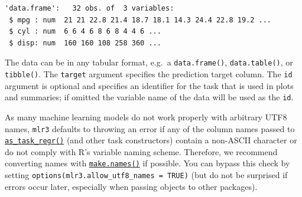 \begin{Shaded}
\begin{Highlighting}[]
\NormalTok{(}\NormalTok{, } \NormalTok{)}
\OtherTok{=}  \NormalTok{(}\NormalTok{, }\NormalTok{, }\NormalTok{))}
\end{Highlighting}
\end{Shaded}

\begin{verbatim}
'data.frame':   32 obs. of  3 variables:
 $ mpg : num  21 21 22.8 21.4 18.7 18.1 14.3 24.4 22.8 19.2 ...
 $ cyl : num  6 6 4 6 8 6 8 4 4 6 ...
 $ disp: num  160 160 108 258 360 ...
\end{verbatim}

\begin{Shaded}
\begin{Highlighting}[]
\OtherTok{=}  \NormalTok{, } \NormalTok{)}
\end{Highlighting}
\end{Shaded}

The data can be in any tabular format, e.g.~a \texttt{data.frame()},
\texttt{data.table()}, or \texttt{tibble()}. The \texttt{target}
argument specifies the prediction target column. The \texttt{id}
argument is optional and specifies an identifier for the task that is
used in plots and summaries; if omitted the variable name of the data
will be used as the \texttt{id}.

\begin{tcolorbox}[enhanced jigsaw, opacitybacktitle=0.6, rightrule=.15mm, opacityback=0, arc=.35mm, breakable, titlerule=0mm, colframe=quarto-callout-tip-color-frame, coltitle=black, bottomrule=.15mm, toprule=.15mm, colback=white, colbacktitle=quarto-callout-tip-color!10!white, bottomtitle=1mm, toptitle=1mm, title=\textcolor{quarto-callout-tip-color}{\faLightbulb}\hspace{0.5em}{UTF8 Column Names}, leftrule=.75mm, left=2mm]

As many machine learning models do not work properly with arbitrary UTF8
names, \texttt{mlr3} defaults to throwing an error if any of the column
names passed to
\href{https://mlr3.mlr-org.com/reference/as_task_regr.html}{\texttt{as\_task\_regr()}}
(and other task constructors) contain a non-ASCII character or do not
comply with R's variable naming scheme. Therefore, we recommend
converting names with
\href{https://www.rdocumentation.org/packages/base/topics/make.names}{\texttt{make.names()}}
if possible. You can bypass this check by setting
\texttt{options(mlr3.allow\_utf8\_names\ =\ TRUE)} (but do not be
surprised if errors occur later, especially when passing objects to
other packages).

\end{tcolorbox}

